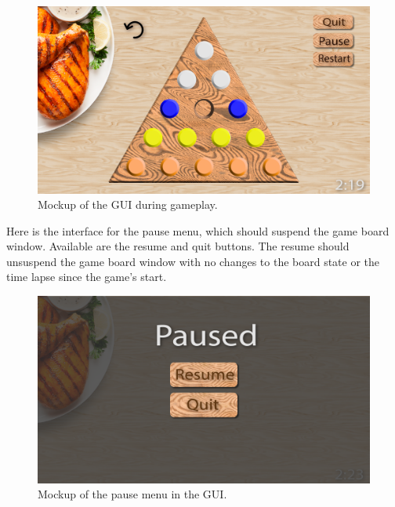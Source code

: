 \documentclass[10pt,conference,onecolumn,compsoc]{IEEEtran}
\begin{document}
\begin{figure}[H]
    \begin{center}
        \includegraphics[scale=0.15]{gameplay.png}
        \caption{Mockup of the GUI during gameplay.}
        \label{fig:board-gameplay}
    \end{center}
\end{figure}

Here is the interface for the pause menu, which should suspend the game board window. Available are the resume and quit buttons. The resume should unsuspend the game board window with no changes to the board state or the time lapse since the game's start.

\begin{figure}[H]
    \begin{center}
        \includegraphics[scale=0.15]{pause-menu.png}
        \caption{Mockup of the pause menu in the GUI.}
        \label{fig:board-pause}
    \end{center}
\end{figure}

\newpage
\end{document}
